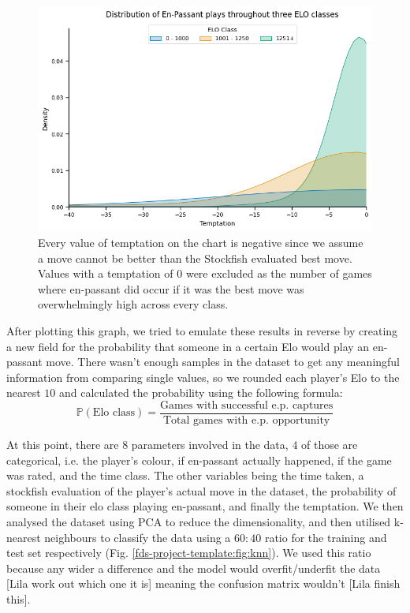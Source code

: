\documentclass[10pt,a4paper]{article}
\begin{document}
\begin{multicols}{2}
\begin{figure}[t]
  \centering
  \includegraphics[width=\textwidth]{report/images/ep_distplot.png}
  \caption{Every value of temptation on the chart is negative since we assume a move cannot be better than the Stockfish evaluated best move. Values with a temptation of $0$ were excluded as the number of games where en-passant did occur if it was the best move was overwhelmingly high across every class.}
  \label{fds-project-template:fig:ep_distplot}
\end{figure}

After plotting this graph, we tried to emulate these results in reverse by creating a new field for the probability that someone in a certain Elo would play an en-passant move. There wasn't enough samples in the dataset to get any meaningful information from comparing single values, so we rounded each player's Elo to the nearest $10$ and calculated the probability using the following formula:
$$\mathbb{P}(\text{Elo class}) = \frac{\text{Games with successful e.p. captures}}{\text{Total games with e.p. opportunity}}$$

At this point, there are $8$ parameters involved in the data, $4$ of those are categorical, i.e. the player's colour, if en-passant actually happened, if the game was rated, and the time class. The other variables being the time taken, a stockfish evaluation of the player's actual move in the dataset, the probability of someone in their elo class playing en-passant, and finally the temptation. We then analysed the dataset using PCA to reduce the dimensionality, and then utilised k-nearest neighbours to classify the data using a $60:40$ ratio for the training and test set respectively (Fig. \ref{fds-project-template:fig:knn}). We used this ratio because any wider a difference and the model would overfit/underfit the data [Lila work out which one it is] meaning the confusion matrix wouldn't [Lila finish this]. \newline


\end{multicols}
\end{document}
